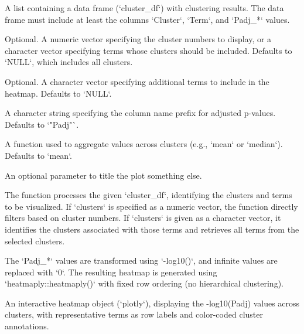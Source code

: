 \documentclass[a4paper]{book}
\begin{document}
\begin{Arguments}
\begin{ldescription}
\item[\code{cluster\_result}] A list containing a data frame (`cluster\_df`) with clustering results.
The data frame must include at least the columns `Cluster`, `Term`, and `Padj\_*` values.

\item[\code{clusters}] Optional. A numeric vector specifying the cluster numbers to display,
or a character vector specifying terms whose clusters should be included. Defaults to `NULL`,
which includes all clusters.

\item[\code{terms}] Optional. A character vector specifying additional terms to include in the heatmap.
Defaults to `NULL`.

\item[\code{value\_type}] A character string specifying the column name prefix for adjusted p-values.
Defaults to `"Padj"`.

\item[\code{aggr\_type}] A function used to aggregate values across clusters (e.g., `mean` or `median`).
Defaults to `mean`.

\item[\code{title}] An optional parameter to title the plot something else.
\end{ldescription}
\end{Arguments}
%
\begin{Details}
The function processes the given `cluster\_df`, identifying the clusters and terms to be visualized.
If `clusters` is specified as a numeric vector, the function directly filters based on cluster numbers.
If `clusters` is given as a character vector, it identifies the clusters associated with those terms
and retrieves all terms from the selected clusters.

The `Padj\_*` values are transformed using `-log10()`, and infinite values are replaced with `0`.
The resulting heatmap is generated using `heatmaply::heatmaply()` with fixed row ordering
(no hierarchical clustering).
\end{Details}
%
\begin{Value}
An interactive heatmap object (`plotly`), displaying the -log10(Padj) values
across clusters, with representative terms as row labels and color-coded cluster annotations.
\end{Value}
\printindex{}
\end{document}
